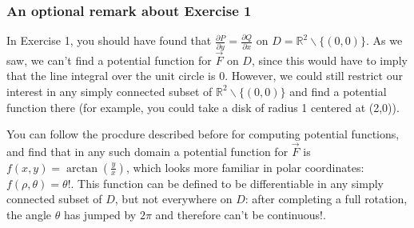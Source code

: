\documentclass[12pt]{article}
\newcommand{\p}{\partial}
\newcommand{\R}{ \mathbb{R}}
\newcommand{\vF}{\vec{F}}
\newcommand{\Q}{\frac{\p Q}{\p x}}
\renewcommand{\P}{\frac{\p P}{\p y}}
\begin{document}
\subsubsection*{An optional remark about Exercise 1}
In Exercise 1, you should have found that $\P=\Q$ on $D=\R^2\backslash \{(0,0)\}$. As we saw, we can't find a potential function for $\vF$ on $D$, since this would have to imply that the line integral over the unit circle is 0. However, we could still restrict our interest in any simply connected subset of $\R^2\backslash \{(0,0)\}$ and find a potential function there (for example, you could take a disk of radius 1 centered at (2,0)). 

You can follow the procdure described before for computing potential functions, and find that in any such domain a potential function for $\vF$ is $f(x,y)=\arctan(\frac{y}{x})$, which looks more familiar in polar coordinates: $f(\rho,\theta)=\theta$!. This function can be defined to be differentiable in any simply connected subset of $D$, but not everywhere on $D$: after completing a full rotation, the angle $\theta$ has jumped by $2\pi$ and therefore can't be continuous!.
\end{document}
